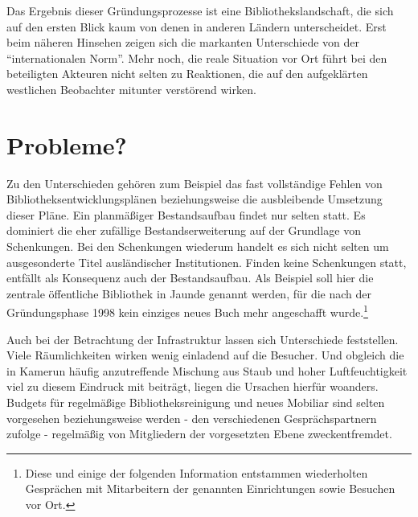 \documentclass[a4paper,
fontsize=11pt,
oneside,
numbers=noperiodatend,
parskip=half-,
bibliography=totoc,
final
]{scrartcl}
\begin{document}
Das Ergebnis dieser Gründungsprozesse ist eine Bibliothekslandschaft,
die sich auf den ersten Blick kaum von denen in anderen Ländern
unterscheidet. Erst beim näheren Hinsehen zeigen sich die markanten
Unterschiede von der \enquote{internationalen Norm}. Mehr noch, die
reale Situation vor Ort führt bei den beteiligten Akteuren nicht selten
zu Reaktionen, die auf den aufgeklärten westlichen Beobachter mitunter
verstörend wirken.

\section*{Probleme?}\label{probleme}

Zu den Unterschieden gehören zum Beispiel das fast vollständige Fehlen
von Bibliotheksentwicklungsplänen beziehungsweise die ausbleibende
Umsetzung dieser Pläne. Ein planmäßiger Bestandsaufbau findet nur selten
statt. Es dominiert die eher zufällige Bestandserweiterung auf der
Grundlage von Schenkungen. Bei den Schenkungen wiederum handelt es sich
nicht selten um ausgesonderte Titel ausländischer Institutionen. Finden
keine Schenkungen statt, entfällt als Konsequenz auch der
Bestandsaufbau. Als Beispiel soll hier die zentrale öffentliche
Bibliothek in Jaunde genannt werden, für die nach der Gründungsphase
1998 kein einziges neues Buch mehr angeschafft wurde.\footnote{Diese und
  einige der folgenden Information entstammen wiederholten Gesprächen
  mit Mitarbeitern der genannten Einrichtungen sowie Besuchen vor Ort.}

Auch bei der Betrachtung der Infrastruktur lassen sich Unterschiede
feststellen. Viele Räumlichkeiten wirken wenig einladend auf die
Besucher. Und obgleich die in Kamerun häufig anzutreffende Mischung aus
Staub und hoher Luftfeuchtigkeit viel zu diesem Eindruck mit beiträgt,
liegen die Ursachen hierfür woanders. Budgets für regelmäßige
Bibliotheksreinigung und neues Mobiliar sind selten vorgesehen
beziehungsweise werden - den verschiedenen Gesprächspartnern zufolge -
regelmäßig von Mitgliedern der vorgesetzten Ebene zweckentfremdet.
\end{document}
